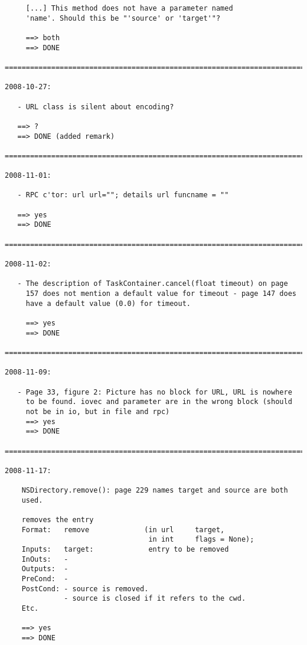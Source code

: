 \documentclass{article}
\begin{document}
\begin{verbatim}
     [...] This method does not have a parameter named
     'name'. Should this be "'source' or 'target'"? 

     ==> both
     ==> DONE

=========================================================================

2008-10-27:

   - URL class is silent about encoding?

   ==> ?
   ==> DONE (added remark)

=========================================================================

2008-11-01:

   - RPC c'tor: url url=""; details url funcname = ""

   ==> yes
   ==> DONE

=========================================================================

2008-11-02:

   - The description of TaskContainer.cancel(float timeout) on page
     157 does not mention a default value for timeout - page 147 does 
     have a default value (0.0) for timeout.

     ==> yes
     ==> DONE

=========================================================================

2008-11-09:

   - Page 33, figure 2: Picture has no block for URL, URL is nowhere
     to be found. iovec and parameter are in the wrong block (should 
     not be in io, but in file and rpc)                                                                                                                   
     ==> yes
     ==> DONE

=========================================================================

2008-11-17:

    NSDirectory.remove(): page 229 names target and source are both
    used.
    
    removes the entry
    Format:   remove             (in url     target,
                                  in int     flags = None);
    Inputs:   target:             entry to be removed
    InOuts:   -
    Outputs:  -
    PreCond:  -
    PostCond: - source is removed.
              - source is closed if it refers to the cwd.
    Etc.

    ==> yes
    ==> DONE


\end{verbatim}
\end{document}

